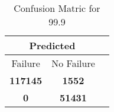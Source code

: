 \begin{table}[] 
\caption{Confusion Matric for 99.9} 
\label{Table: Prediction Accuracy-DMD99.9OnlySunEKF-resetReflectionEKF-top2-Reflection} 
\centering 
\begin{tabular} 
 {@{}ccc@{}} 
\toprule 
\multicolumn{2}{c}{\textbf{Predicted}}
 \\ \midrule 
\multicolumn{1}{|c|}{Failure} & 
\multicolumn{1}{c|}{No Failure}
 \\ \midrule 
\multicolumn{1}{|c|}{\color{green}\textbf{117145}} & 
\multicolumn{1}{c|}{\color{red}\textbf{1552}}
 \\ \midrule 
\multicolumn{1}{|c|}{\color{red}\textbf{0}} & 
\multicolumn{1}{c|}{\color{green}\textbf{51431}}
 \\ \bottomrule 
\end{tabular} 
\end{table} 
